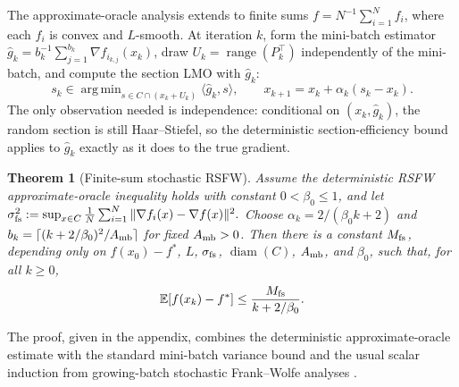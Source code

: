 \documentclass{article}
\DeclareMathOperator*{\argmin}{arg\,min}
\DeclareMathOperator{\range}{range}
\DeclareMathOperator{\diam}{diam}
\newtheorem{theorem}{Theorem}
\begin{document}
The approximate-oracle analysis extends to finite sums
\(f=N^{-1}\sum_{i=1}^N f_i\), where each \(f_i\) is convex and \(L\)-smooth.
At iteration \(k\), form the mini-batch estimator
\(\widehat g_k=b_k^{-1}\sum_{j=1}^{b_k}\nabla f_{i_{k,j}}(x_k)\), draw
\(U_k=\range(P_k^\top)\) independently of the mini-batch, and compute the
section LMO with \(\widehat g_k\):
\[
s_k\in\argmin_{s\in C\cap(x_k+U_k)}\langle \widehat g_k,s\rangle,\qquad
x_{k+1}=x_k+\alpha_k(s_k-x_k).
\]
The only observation needed is independence: conditional on
\((x_k,\widehat g_k)\), the random section is still Haar--Stiefel, so the
deterministic section-efficiency bound applies to \(\widehat g_k\) exactly as it
does to the true gradient.
\begin{theorem}[Finite-sum stochastic RSFW]
\label{thm:main_stoch_rsfw}
Assume the deterministic RSFW approximate-oracle inequality holds with constant
\(0<\beta_0\le1\), and let
$
\sigma_{\rm fs}^2:=
\sup_{x\in C}\frac1N\sum_{i=1}^N
\|\nabla f_i(x)-\nabla f(x)\|^2 .
$
Choose \(\alpha_k=2/(\beta_0 k+2)\) and
\(b_k=\lceil (k+2/\beta_0)^2/A_{\rm mb}\rceil\) for fixed
\(A_{\rm mb}>0\). Then there is a constant \(M_{\rm fs}\), depending only on
\(f(x_0)-f^*\), \(L\), \(\sigma_{\rm fs}\), \(\diam(C)\), \(A_{\rm mb}\), and
\(\beta_0\), such that, for all \(k\ge0\),
\[
\mathbb E[f(x_k)-f^*]\le\frac{M_{\rm fs}}{k+2/\beta_0}.
\]
\end{theorem}
The proof, given in the appendix, combines the deterministic approximate-oracle
estimate with the standard mini-batch variance bound and the usual scalar
induction from growing-batch stochastic Frank--Wolfe analyses
\cite{HazanLuo2016VRPF,NegiarDresdnerTsaiElGhaouiLocatelloFreundPedregosa2020SFW,DresdnerVladareanRatschLocatelloCevherYurtsever2022OneSample}.

\end{document}
